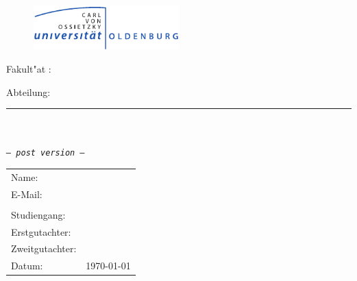\thispagestyle{empty}
\addtolength{\topmargin}{-\myTopMargin}
\enlargethispage{\myEnlargement}
\vspace*{-2cm}
\begin{figure}[htbp]
	\centering
	\includegraphics[width=0.5\textwidth]{./images/logoUniOL.pdf}
\end{figure}
\begin{center}
	\large{Fakult"at \myFakultaet: \myFachbereich \newline \myInstitut}

	\large{Abteilung: \myAbteilung}    
	\vspace*{0.5cm}

	{\color{grau}\noindent\rule{\textwidth-5cm}{1pt}}

	\vspace*{4.5cm}

	{\textbf{\LARGE \myTitle \\}}
	\vspace*{1.5cm}
	{\Large \myDocumentType\\}
	\vspace*{0.5cm}
	{\large \textit{\texttt{-- post version --}}}
\end{center}
\vfill
\normalsize{
	\begin{tabular}{ll}
	    	Name: & {\myName} \\
		E-Mail: & \myEmail \\ \\
	    	Studiengang: & \myStudiengang\\
		Erstgutachter: & \myFirstPruefer \\
		Zweitgutachter: & \mySecondPruefer \\
		Datum: & \today \\
	\end{tabular}
}
\addtolength{\topmargin}{\myTopMargin}
